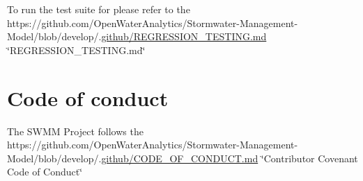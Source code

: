 To run the test suite for please refer to the https\+://github.com/\+Open\+Water\+Analytics/\+Stormwater-\/\+Management-\/\+Model/blob/develop/.\hyperlink{_r_e_g_r_e_s_s_i_o_n___t_e_s_t_i_n_g_8md_source}{github/\+R\+E\+G\+R\+E\+S\+S\+I\+O\+N\+\_\+\+T\+E\+S\+T\+I\+N\+G.\+md} \char`\"{}\+R\+E\+G\+R\+E\+S\+S\+I\+O\+N\+\_\+\+T\+E\+S\+T\+I\+N\+G.\+md\char`\"{}

\section*{Code of conduct}

The S\+W\+MM Project follows the https\+://github.com/\+Open\+Water\+Analytics/\+Stormwater-\/\+Management-\/\+Model/blob/develop/.\hyperlink{_c_o_d_e___o_f___c_o_n_d_u_c_t_8md_source}{github/\+C\+O\+D\+E\+\_\+\+O\+F\+\_\+\+C\+O\+N\+D\+U\+C\+T.\+md} \char`\"{}\+Contributor Covenant Code of Conduct\char`\"{} 